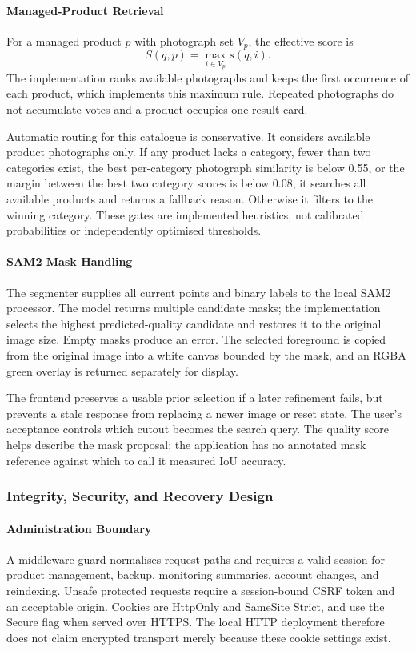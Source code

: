 \paragraph{Managed-Product Retrieval}
For a managed product $p$ with photograph set $V_p$, the effective score is
\begin{equation}
 S(q,p)=\max_{i\in V_p}s(q,i).
 \label{eq:product-max}
\end{equation}
The implementation ranks available photographs and keeps the first occurrence
of each product, which implements this maximum rule. Repeated photographs do not
accumulate votes and a product occupies one result card.

Automatic routing for this catalogue is conservative. It considers available
product photographs only. If any product lacks a category, fewer than two
categories exist, the best per-category photograph similarity is below 0.55,
or the margin between the best two category scores is below 0.08, it searches
all available products and returns a fallback reason. Otherwise it filters
to the winning category. These gates are implemented heuristics, not calibrated
probabilities or independently optimised thresholds.

\paragraph{SAM2 Mask Handling}
The segmenter supplies all current points and binary labels to the local SAM2
processor. The model returns multiple candidate masks; the implementation
selects the highest predicted-quality candidate and restores it to the original
image size. Empty masks produce an error. The selected foreground is copied from
the original image into a white canvas bounded by the mask, and an RGBA green
overlay is returned separately for display.

The frontend preserves a usable prior selection if a later refinement fails,
but prevents a stale response from replacing a newer image or reset state.
The user's acceptance controls which cutout becomes the search query. The
quality score helps describe the mask proposal; the application has no annotated
mask reference against which to call it measured IoU accuracy.

\subsubsection{Integrity, Security, and Recovery Design}
\paragraph{Administration Boundary}
A middleware guard normalises request paths and requires a valid session for
product management, backup, monitoring summaries, account changes, and reindexing.
Unsafe protected requests require a session-bound CSRF token and an acceptable
origin. Cookies are HttpOnly and SameSite Strict, and use the Secure flag when
served over HTTPS. The local HTTP deployment therefore does not claim encrypted
transport merely because these cookie settings exist.

